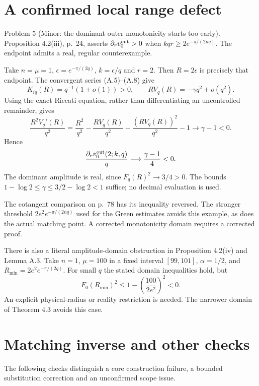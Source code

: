 \documentclass[10pt]{article}
\begin{document}
\section*{A confirmed local range defect}
Problem 5 (Minor: the dominant outer monotonicity starts too early).  Proposition 4.2(iii), p. 24, asserts \(\partial_rv_0^{\rm out}>0\) when \(kqr\ge2e^{-\pi/(2nq)}\). The endpoint admits a real, regular counterexample.\par
Take \(n=\mu=1\), \(\epsilon=e^{-\pi/(2q)}\), \(k=\epsilon/q\) and \(r=2\). Then \(R=2\epsilon\) is precisely that endpoint. The convergent series (A.5)–(A.8) give \[K_{iq}(R)=q^{-1}(1+o(1))>0,\qquad
 RV_q(R)=-\gamma q^2+o(q^2).\] Using the exact Riccati equation, rather than differentiating an uncontrolled remainder, gives \[\frac{R^2V_q'(R)}{q^2}
 =\frac{R^2}{q^2}-\frac{RV_q(R)}{q^2}
   -\frac{(RV_q(R))^2}{q^2}-1\longrightarrow\gamma-1<0.\] Hence \[\frac{\partial_rv_0^{\rm out}(2;k,q)}q
            \longrightarrow\frac{\gamma-1}{4}<0.\] The dominant amplitude is real, since \(F_q(R)^2\to3/4>0\). The bounds \(1-\log2\le\gamma\le3/2-\log2<1\) suffice; no decimal evaluation is used.\par
The cotangent comparison on p. 78 has its inequality reversed. The stronger threshold \(2e^2e^{-\pi/(2nq)}\) used for the Green estimates avoids this example, as does the actual matching point. A corrected monotonicity domain requires a corrected proof.\par
There is also a literal amplitude-domain obstruction in Proposition 4.2(iv) and Lemma A.3. Take \(n=1\), \(\mu=100\) in a fixed interval \([99,101]\), \(\alpha=1/2\), and \(R_{\min}=2e^2e^{-\pi/(2q)}\). For small \(q\) the stated domain inequalities hold, but \[F_0(R_{\min})^2
 \le1-\left(\frac{100}{2e^2}\right)^2<0.\] An explicit physical-radius or reality restriction is needed. The narrower domain of Theorem 4.3 avoids this case.\par
\section*{Matching inverse and other checks}
The following checks distinguish a core construction failure, a bounded substitution correction and an unconfirmed scope issue.\par
\end{document}
